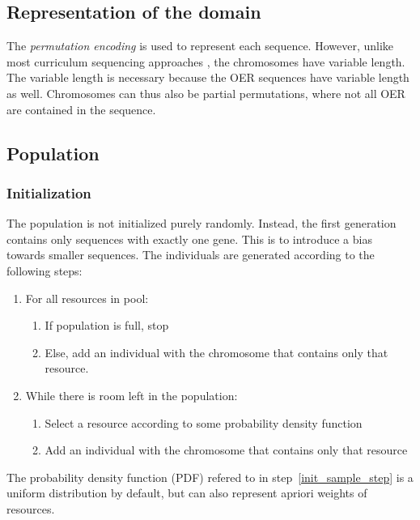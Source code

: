 \subsection{Representation of the domain}
\label{sec:approach_representation}
The \emph{permutation encoding} is used to represent each
sequence. However, unlike most curriculum sequencing approaches
\citep{AlMuhaideb2011}, the chromosomes have variable length. The variable
length is necessary because the OER sequences have variable length as well.
Chromosomes can thus also be partial permutations, where not all OER are
contained in the sequence.
\subsection{Population}
\subsubsection{Initialization}
\label{sec:approach_initialization}
The population is not initialized purely randomly. Instead, the first
generation contains only sequences with exactly one gene. This is to introduce
a bias towards smaller sequences. The individuals are generated according to
the following steps:
\begin{enumerate}
	\item For all resources in pool:
		\begin{enumerate}
			\item If population is full, stop
			\item Else, add an individual with the chromosome that contains
				only that resource.
		\end{enumerate}
	\item While there is room left in the population:
		\begin{enumerate}
			\item \label{init_sample_step}Select a resource according to some probability density function
			\item Add an individual with the chromosome that contains only that
				resource
		\end{enumerate}
\end{enumerate}
The probability density function (PDF) refered to in
step~\ref{init_sample_step} is a uniform distribution by default, but can also
represent apriori weights of resources.
